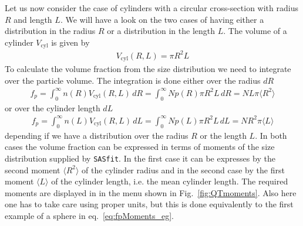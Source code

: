 Let us now consider the case of cylinders with a circular
cross-section with radius $R$ and length $L$. We will have a look on
the two cases of having either a distribution in the radius $R$ or a
distribution in the length $L$. The volume of a cylinder
$V_\textrm{cyl}$ is given by
\begin{align}
V_\textrm{cyl}(R,L) = \pi R^2 L
\end{align}
To calculate the volume fraction from the size distribution we need
to integrate over the particle volume. The integration is done
either over the radius $dR$
\begin{align}
f_p = \int_0^\infty n(R) V_\textrm{cyl}(R,L) \, dR
    = \int_0^\infty N p(R) \pi R^2 L \, dR
    = N L \pi \langle R^2 \rangle
\label{eq:fpMomentsCylR}
\end{align}
or over the cylinder length $dL$
\begin{align}
f_p = \int_0^\infty n(L) V_\textrm{cyl}(R,L) \, dL
    = \int_0^\infty N p(L) \pi R^2 L \, dL
    = N R^2 \pi \langle L \rangle
\label{eq:fpMomentsCylR}
\end{align}
depending if we have a distribution over the radius $R$ or the
length $L$. In both cases the volume fraction can be expressed in
terms of moments of the size distribution supplied by {\tt SASfit}.
In the first case it can be expresses by the second moment $\langle
R^2 \rangle$ of the cylinder radius and in the second case by the
first moment $\langle L \rangle$ of the cylinder length, i.e. the
mean cylinder length. The required moments are displayed in \SASfit
in the menu shown in Fig.\ \ref{fig:QTmoments}. Also here one has to
take care using proper units, but this is done equivalently to the
first example of a sphere in eq.\ \ref{eq:fpMoments_eg}.

